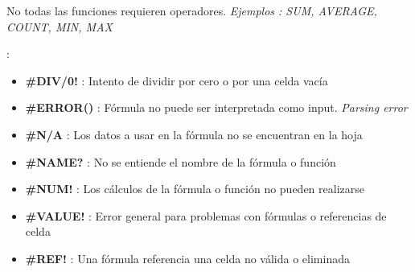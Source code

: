 \begin{description}
{    \begin{description}
        \item {No todas las funciones requieren operadores. \textit{Ejemplos : SUM, AVERAGE, COUNT, MIN, MAX}}
        \item[Errores Comunes]{ : 
        \begin{itemize}
            \item {\textbf{\#DIV/0!} : Intento de dividir por cero o por una celda vacía}
            \item {\textbf{\#ERROR()} : Fórmula no puede ser interpretada como input. \textit{Parsing error}}
            \item {\textbf{\#N/A} : Los datos a usar en la fórmula no se encuentran en la hoja}
            \item {\textbf{\#NAME?} : No se entiende el nombre de la fórmula o función}
            \item {\textbf{\#NUM!} : Los cálculos de la fórmula o función no pueden realizarse}
            \item {\textbf{\#VALUE!} : Error general para problemas con fórmulas o referencias de celda}
            \item {\textbf{\#REF!} : Una fórmula referencia una celda no válida o eliminada}
        \end{itemize}} 
    \end{description}}
\end{description}



